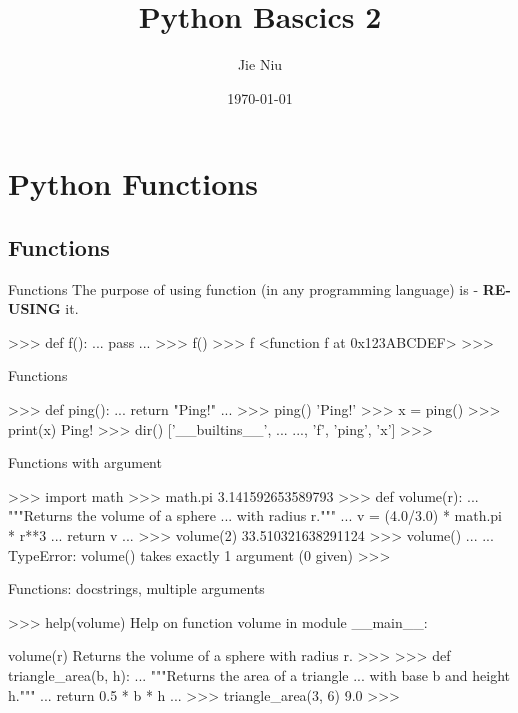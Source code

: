 \documentclass{beamer}
\title{Python Bascics 2}
\author{Jie Niu}
\institute{IGWES, JNU}
\date{\today}
\begin{document}
\begin{frame}
  \titlepage
\end{frame}

\section{Python Functions}
\subsection{Functions}

\begin{frame}[fragile]{Functions}
The purpose of using function (in any programming language) is - \textbf{RE-USING} it.\\
\begin{pythoncode}
>>> def f():
...     pass
...
>>> f()
>>> f
<function f at 0x123ABCDEF>
>>>
\end{pythoncode}
\end{frame}

\begin{frame}[fragile]{Functions}
\begin{pythoncode}
>>> def ping():
...     return "Ping!"
...
>>> ping()
'Ping!'
>>> x = ping()
>>> print(x)
Ping!
>>> dir()
['__builtins__', ... ..., 'f', 'ping', 'x']
>>>
\end{pythoncode}
\end{frame}

\begin{frame}[fragile]{Functions with argument}
\begin{pythoncode}
>>> import math
>>> math.pi
3.141592653589793
>>> def volume(r):
...     """Returns the volume of a sphere 
...        with radius r."""
...     v = (4.0/3.0) * math.pi * r**3
...     return v
...
>>> volume(2)
33.510321638291124
>>> volume()
... ...
TypeError: volume() takes exactly 1 argument (0 given)
>>>
\end{pythoncode}
\end{frame}

\begin{frame}[fragile]{Functions: docstrings, multiple arguments}
\begin{pythoncode}
>>> help(volume)
Help on function volume in module __main__:

volume(r)
Returns the volume of a sphere with radius r.
>>>
>>> def triangle_area(b, h):
...     """Returns the area of a triangle
...        with base b and height h."""
...     return 0.5 * b * h
...
>>> triangle_area(3, 6)
9.0
>>>
\end{pythoncode}
\end{frame}
\end{document}
